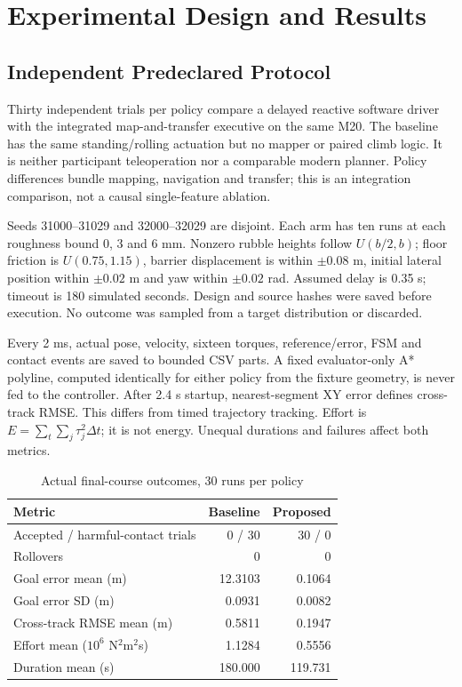 \documentclass[conference]{IEEEtran}
\begin{document}
\clearpage
\section{Experimental Design and Results}
\subsection{Independent Predeclared Protocol}
Thirty independent trials per policy compare a delayed reactive software driver with the integrated map-and-transfer executive on the same M20. The baseline has the same standing/rolling actuation but no mapper or paired climb logic. It is neither participant teleoperation nor a comparable modern planner. Policy differences bundle mapping, navigation and transfer; this is an integration comparison, not a causal single-feature ablation.

Seeds 31000--31029 and 32000--32029 are disjoint. Each arm has ten runs at each roughness bound 0, 3 and 6 mm. Nonzero rubble heights follow $U(b/2,b)$; floor friction is $U(0.75,1.15)$, barrier displacement is within $\pm0.08$ m, initial lateral position within $\pm0.02$ m and yaw within $\pm0.02$ rad. Assumed delay is 0.35 s; timeout is 180 simulated seconds. Design and source hashes were saved before execution. No outcome was sampled from a target distribution or discarded.

Every 2 ms, actual pose, velocity, sixteen torques, reference/error, FSM and contact events are saved to bounded CSV parts. A fixed evaluator-only A* polyline, computed identically for either policy from the fixture geometry, is never fed to the controller. After 2.4 s startup, nearest-segment XY error defines cross-track RMSE. This differs from timed trajectory tracking. Effort is $E=\sum_t\sum_j\tau_j^2\Delta t$; it is not energy. Unequal durations and failures affect both metrics.

\begin{table}[t]
\caption{Actual final-course outcomes, 30 runs per policy}
\centering\begin{tabular}{lrr}\toprule
Metric & Baseline & Proposed\\\midrule
Accepted / harmful-contact trials & 0 / 30 & 30 / 0\\
Rollovers & 0 & 0\\
Goal error mean (m) & 12.3103 & 0.1064\\
Goal error SD (m) & 0.0931 & 0.0082\\
Cross-track RMSE mean (m) & 0.5811 & 0.1947\\
Effort mean ($10^6$ N$^2$m$^2$s) & 1.1284 & 0.5556\\
Duration mean (s) & 180.000 & 119.731\\\bottomrule
\end{tabular}\end{table}
\end{document}
